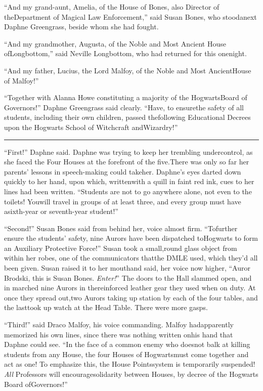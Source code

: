 ``And my grand-aunt, Amelia, of the House of Bones, also Director of theDepartment of Magical Law Enforcement,'' said Susan Bones, who stoodanext Daphne Greengrass, beside whom she had fought.

``And my grandmother, Augusta, of the Noble and Most Ancient House ofLongbottom,'' said Neville Longbottom, who had returned for this onenight.

``And my father, Lucius, the Lord Malfoy, of the Noble and Most AncientHouse of Malfoy!''

``Together with Alanna Howe constituting a majority of the HogwartsBoard of Governors!'' Daphne Greengrass said clearly. ``Have, to ensurethe safety of all students, including their own children, passed thefollowing Educational Decrees upon the Hogwarts School of Witchcraft andWizardry!''

\begin{center}\rule{3in}{0.4pt}\end{center}

``First!'' Daphne said. Daphne was trying to keep her trembling undercontrol, as she faced the Four Houses at the forefront of the five.There was only so far her parents' lessons in speech-making could takeher. Daphne's eyes darted down quickly to her hand, upon which, writtenwith a quill in faint red ink, cues to her lines had been written.
``Students are not to go anywhere alone, not even to the toilets! Youwill travel in groups of at least three, and every group must have asixth-year or seventh-year student!''

``Second!'' Susan Bones said from behind her, voice almost firm. ``Tofurther ensure the students' safety, nine Aurors have been dispatched toHogwarts to form an Auxiliary Protective Force!'' Susan took a small,round glass object from within her robes, one of the communicators thatthe DMLE used, which they'd all been given. Susan raised it to her mouthand said, her voice now higher, ``Auror Brodski, this is Susan Bones.
\emph{Enter!}''
The doors to the Hall slammed open, and in marched nine Aurors in thereinforced leather gear they used when on duty. At once they spread out,two Aurors taking up station by each of the four tables, and the lasttook up watch at the Head Table. There were more gasps.

``Third!'' said Draco Malfoy, his voice commanding. Malfoy hadapparently memorized his own lines, since there was nothing written onhis hand that Daphne could see. ``In the face of a common enemy who doesnot balk at killing students from any House, the four Houses of Hogwartsmust come together and act as one! To emphasize this, the House Pointssystem is temporarily suspended! \emph{All} Professors will encouragesolidarity between Houses, by decree of the Hogwarts Board ofGovernors!''

